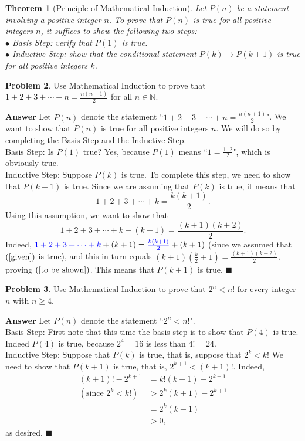 \documentclass[12pt,letterpaper]{book}
\def\blue{\textcolor{blue}}
\numberwithin{equation}{section}
\newtheorem{thm}{\textbf{Theorem}}[section]
\theoremstyle{definition}
\newtheorem{problem}[thm]{\textbf{Problem}}
\newenvironment{answer}{\noindent\textbf{Answer}}{\hfill$\blacksquare$\vspace{0.1in}}
\begin{document}
\begin{thm}[Principle of Mathematical Induction] Let $P(n)$ be a statement involving a positive integer $n$. To prove that $P(n)$ is true for all positive integers $n$, it suffices to show the following two steps:\\
$\bullet$ Basis Step: verify that $P(1)$ is true.\\
$\bullet$ Inductive Step: show that the conditional statement $P(k)\to P(k+1)$ is true for all positive integers $k$.
\end{thm}

\begin{problem}\label{induction sum of n} Use Mathematical Induction to prove that $1+2+3+\cdots+n=\frac{n(n+1)}{2}$ for all $n\in \mathbb{N}$.
\end{problem}

\begin{answer} Let $P(n)$ denote the statement ``$1+2+3+\cdots+n=\frac{n(n+1)}{2}$". We want to show that $P(n)$ is true for all positive integers $n$. We will do so by completing the Basis Step and the Inductive Step.\\
Basis Step: Is $P(1)$ true? Yes, because $P(1)$ means ``$1=\frac{1\cdot 2}{2}$", which is obviously true.\\
Inductive Step: Suppose $P(k)$ is true. To complete this step, we need to show that $P(k+1)$ is true. Since we are assuming that $P(k)$ is true, it means that
\begin{equation}\label{given}1+2+3+\cdots+k=\frac{k(k+1)}{2}. \end{equation}
Using this assumption, we want to show that
\begin{equation}\label{to be shown}1+2+3+\cdots+k+(k+1)=\frac{(k+1)(k+2)}{2}. \end{equation}
Indeed, $\blue{1+2+3+\cdots+k}+(k+1)=\blue{\frac{k(k+1)}{2}}+(k+1)$ (since we assumed that $(\ref{given})$ is true), and this in turn equals $(k+1)\left(\frac{k}{2}+1\right)=\frac{(k+1)(k+2)}{2}$, proving $(\ref{to be shown})$. This means that $P(k+1)$ is true.
\end{answer}

\begin{problem} Use Mathematical Induction to prove that $2^n<n!$ for every integer $n$ with $n\geq 4$.
\end{problem}

\begin{answer}
Let $P(n)$ denote the statement ``$2^n<n!$".\\
Basis Step: First note that this time the basis step is to show that $P(4)$ is true. Indeed $P(4)$ is true, because $2^4=16$ is less than $4!=24$.\\
Inductive Step: Suppose that $P(k)$ is true, that is, suppose that $2^k<k!$ We need to show that $P(k+1)$ is true, that is, $2^{k+1}<(k+1)!$. Indeed,
\begin{align*}(k+1)!-2^{k+1}&=k!(k+1)-2^{k+1}\\
(\text{since }2^k<k!)&>2^k(k+1)-2^{k+1}\\
&=2^k(k-1)\\
&>0,
\end{align*}
as desired.
\end{answer}
\end{document}

